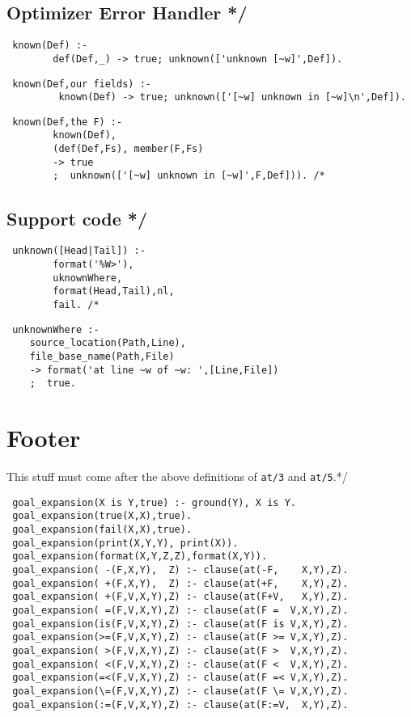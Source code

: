 \documentclass{article}
\begin{document}
\subsection*{Optimizer Error Handler */\label{Optimizer_Error_Handler_}}
\begin{verbatim}
 known(Def) :- 
        def(Def,_) -> true; unknown(['unknown [~w]',Def]).
\end{verbatim}
\begin{verbatim}
 known(Def,our fields) :-
         known(Def) -> true; unknown(['[~w] unknown in [~w]\n',Def]).
\end{verbatim}
\begin{verbatim}
 known(Def,the F) :- 
        known(Def),
        (def(Def,Fs), member(F,Fs)
        -> true
        ;  unknown(['[~w] unknown in [~w]',F,Def])). /*
\end{verbatim}
\subsection*{Support code */\label{Support_code_}}
\begin{verbatim}
 unknown([Head|Tail]) :-
        format('%W>'),
        uknownWhere,
        format(Head,Tail),nl,
        fail. /*
\end{verbatim}
\begin{verbatim}
 unknownWhere :-
    source_location(Path,Line),
    file_base_name(Path,File)
    -> format('at line ~w of ~w: ',[Line,File])
    ;  true.
\end{verbatim}
\section{Footer\label{Footer}}


This stuff must come after the above definitions of \texttt{at/3} and 
\texttt{at/5}.*/

\begin{verbatim}
 goal_expansion(X is Y,true) :- ground(Y), X is Y.
 goal_expansion(true(X,X),true).
 goal_expansion(fail(X,X),true).
 goal_expansion(print(X,Y,Y), print(X)).
 goal_expansion(format(X,Y,Z,Z),format(X,Y)).
 goal_expansion( -(F,X,Y),  Z) :- clause(at(-F,    X,Y),Z).
 goal_expansion( +(F,X,Y),  Z) :- clause(at(+F,    X,Y),Z).
 goal_expansion( +(F,V,X,Y),Z) :- clause(at(F+V,   X,Y),Z).
 goal_expansion( =(F,V,X,Y),Z) :- clause(at(F =  V,X,Y),Z).
 goal_expansion(is(F,V,X,Y),Z) :- clause(at(F is V,X,Y),Z).
 goal_expansion(>=(F,V,X,Y),Z) :- clause(at(F >= V,X,Y),Z).
 goal_expansion( >(F,V,X,Y),Z) :- clause(at(F >  V,X,Y),Z).
 goal_expansion( <(F,V,X,Y),Z) :- clause(at(F <  V,X,Y),Z).
 goal_expansion(=<(F,V,X,Y),Z) :- clause(at(F =< V,X,Y),Z).
 goal_expansion(\=(F,V,X,Y),Z) :- clause(at(F \= V,X,Y),Z).
 goal_expansion(:=(F,V,X,Y),Z) :- clause(at(F:=V,  X,Y),Z).
\end{verbatim}
\printindex
\end{document}
